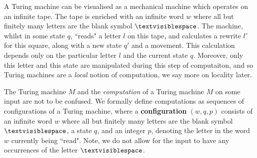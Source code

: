 \documentclass[12pt]{article}
\theoremstyle{plain}
\theoremstyle{definition}
\newcommand{\blank}{\textvisiblespace}
\begin{document}
	A Turing machine can be visualised as a mechanical machine which operates on an infinite tape. The tape is enriched with an infinite word $w$ where all but finitely many letters are the blank symbol $\blank$. The machine, whilst in some state $q$, ``reads" a letter $l$ on this tape, and calculates a rewrite $l'$ for this square, along with a new state $q'$ and a movement. This calculation depends only on the particular letter $l$ and the current state $q$. Moreover, only this letter and this state are manipulated during this step of computaiton, and so Turing machines are a \emph{local} notion of computation, we say more on locality later.
	
	The Turing machine $M$ and the \emph{computation} of a Turing machine $M$ on some input are not to be confused. We formally define computations as sequences of configurations of a Turing machine, where a \textbf{configuration} $(w, q, p)$ consists of an infinite word $w$ where all but finitely many letters are the blank symbol $\blank$, a state $q$, and an integer $p$, denoting the letter in the word $w$ currently being ``read". Note, we do not allow for the input to have any occurrences of the letter $\blank$.
\end{document}
